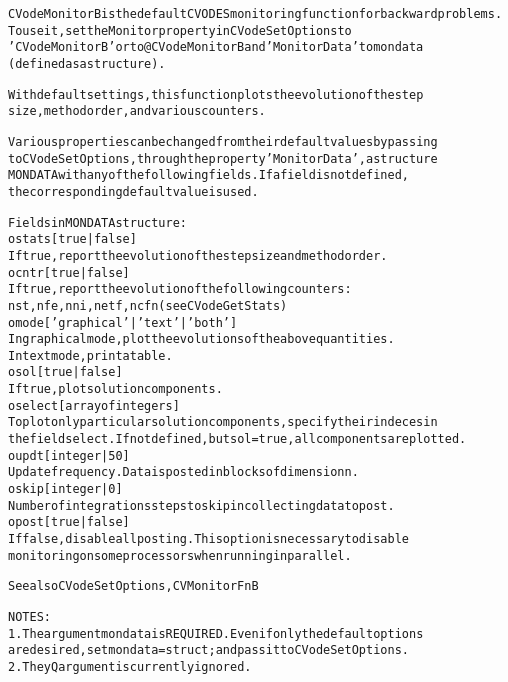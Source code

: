 \begin{alltt}
CVodeMonitorB is the default CVODES monitoring function for backward problems.
   To use it, set the Monitor property in CVodeSetOptions to
   'CVodeMonitorB' or to @CVodeMonitorB and 'MonitorData' to mondata
   (defined as a structure).
  
   With default settings, this function plots the evolution of the step 
   size, method order, and various counters.
   
   Various properties can be changed from their default values by passing
   to CVodeSetOptions, through the property 'MonitorData', a structure
   MONDATA with any of the following fields. If a field is not defined, 
   the corresponding default value is used.

   Fields in MONDATA structure:
     o stats [ {true} | false ]
         If true, report the evolution of the step size and method order.
     o cntr [ {true} | false ]
         If true, report the evolution of the following counters:
         nst, nfe, nni, netf, ncfn (see CVodeGetStats)
     o mode [ {'graphical'} | 'text' | 'both' ] 
         In graphical mode, plot the evolutions of the above quantities.
         In text mode, print a table.
     o sol  [ true | {false} ]
         If true, plot solution components.
     o select [ array of integers ]
         To plot only particular solution components, specify their indeces in
         the field select. If not defined, but sol=true, all components are plotted.
     o updt [ integer | {50} ]
         Update frequency. Data is posted in blocks of dimension n.
     o skip [ integer | {0} ]
         Number of integrations steps to skip in collecting data to post.
     o post [ {true} | false ]
         If false, disable all posting. This option is necessary to disable
         monitoring on some processors when running in parallel.

   See also CVodeSetOptions, CVMonitorFnB

   NOTES:
     1. The argument mondata is REQUIRED. Even if only the default options
        are desired, set mondata=struct; and pass it to CVodeSetOptions.
     2. The yQ argument is currently ignored.
\end{alltt}






\vspace{0.1in}
